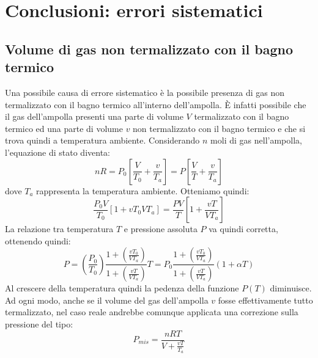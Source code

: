 \section{Conclusioni: errori sistematici}
\subsection{Volume di gas non termalizzato con il bagno termico}
Una possibile causa di errore sistematico è la possibile presenza di gas non termalizzato con il bagno termico all'interno dell'ampolla.
È infatti possibile che il gas dell'ampolla presenti una parte di volume $V$ termalizzato con il bagno termico ed una parte di volume $v$ non termalizzato con il bagno termico e che si trova quindi a temperatura ambiente.
Considerando $n$ moli di gas nell'ampolla, l'equazione di stato diventa:
\begin{equation}
n R = P_0 \left[\frac{V}{T_0} + \frac{v}{T_a}\right] = P \left[\frac{V}{T} + \frac{v}{T_a}\right]
\end{equation}
dove $T_a$ rappresenta la temperatura ambiente.
Otteniamo quindi:
\begin{equation}
\frac{P_0 V}{T_0} \left[1 + v T_0 V T_a\right]= \frac{P V}{T} \left[1 + \frac{v T}{V T_a}\right]
\end{equation}
La relazione tra temperatura $T$  e pressione assoluta $P$ va quindi corretta, ottenendo quindi:
\begin{equation}
P = \left(\frac{P_0}{T_0}\right) \frac{1 + \left(\frac{v T_0}{V T_a} \right)}{1 + \left(\frac{v T}{V T_a}\right)} T = P_0 \frac{1 + \left(\frac {v T_0}{V T_a}\right)}{1 + \left(\frac{v T}{V T_a}\right)} \left(1 + \alpha T \right)
\end{equation}
Al crescere della temperatura quindi la pedenza della funzione $P(T)$ diminuisce.
Ad ogni modo, anche se il volume del gas dell'ampolla $v$ fosse effettivamente tutto termalizzato, nel caso reale andrebbe comunque applicata una correzione sulla pressione del tipo:
\begin{equation}
P_{mis} = \frac{n R T}{V + \frac{v T}{T_a}}
\end{equation}
